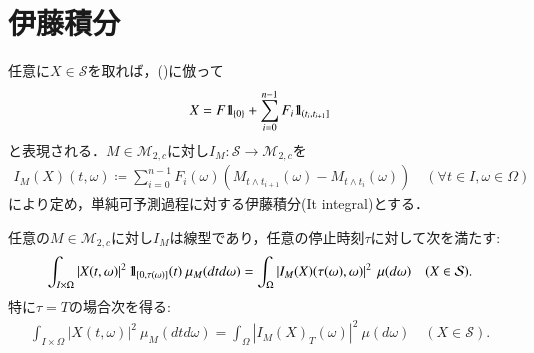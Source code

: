 \section{伊藤積分}
	
	\begin{screen}
		\begin{dfn}[単純可予測過程に対する伊藤積分]
			任意に$X \in \mathcal{S}$を取れば，()に倣って
			\begin{align}
				X = F \mbox{1}\hspace{-0.25em}\mbox{l}_{\{0\}} + \sum_{i=0}^{n-1} F_i \mbox{1}\hspace{-0.25em}\mbox{l}_{\left(t_i,t_{i+1}\right]}
				\label{eq:dfn_Ito_integral_simple_predictable_process}
			\end{align}
			と表現される．$M \in \mathcal{M}_{2,c}$に対し$I_M:\mathcal{S} \rightarrow \mathcal{M}_{2,c}$を
			\begin{align}
				I_M(X)(t,\omega) \coloneqq \sum_{i=0}^{n-1} F_i(\omega) \left(M_{t \wedge t_{i+1}}(\omega) - M_{t \wedge t_i}(\omega)\right)
				\quad (\forall t \in I,\omega \in \Omega)
			\end{align}
			により定め，単純可予測過程に対する伊藤積分(It integral)とする．
			\label{dfn:Ito_integral_simple_predictable_process}
		\end{dfn}
	\end{screen}
	
	\begin{screen}
		\begin{thm}[単純可予測過程に対する伊藤積分の線型等長性]
			任意の$M \in \mathcal{M}_{2,c}$に対し$I_M$は線型であり，任意の停止時刻$\tau$に対して次を満たす:
			\begin{align}
				\int_{I \times \Omega} \left| X(t,\omega) \right|^2 \mbox{1}\hspace{-0.25em}\mbox{l}_{[0,\tau(\omega)]}(t)\ \mu_M(dtd\omega)
				= \int_\Omega \left| I_M(X)(\tau(\omega),\omega) \right|^2\ \mu(d\omega)
				\quad (X \in \mathcal{S}).
				\label{eq:thm_Ito_integral_linearity_isometric}
			\end{align}
			特に$\tau = T$の場合次を得る:
			\begin{align}
				\int_{I \times \Omega} \left| X(t,\omega) \right|^2\ \mu_M(dtd\omega)
				= \int_\Omega \left| I_M(X)_T(\omega) \right|^2\ \mu(d\omega)
				\quad (X \in \mathcal{S}).
				\label{eq:thm_Ito_integral_linearity_isometric_3}
			\end{align}
			\label{thm:Ito_integral_linearity_isometric}
		\end{thm}
	\end{screen}
	
